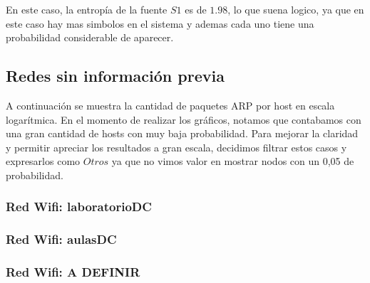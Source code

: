 En este caso, la entropía de la fuente $S1$ es de $1.98$, lo que suena logico, ya que en este caso hay mas simbolos en el sistema y ademas cada uno tiene una probabilidad considerable de aparecer.

\subsection{Redes sin información previa}
A continuación se muestra la cantidad de paquetes ARP por host en escala logarítmica. 
En el momento de realizar los gráficos, notamos que contabamos con una gran cantidad de hosts con muy baja probabilidad. 
Para mejorar la claridad y permitir apreciar los resultados a gran escala, decidimos filtrar estos casos y expresarlos como $Otros$ ya que 
no vimos valor en mostrar nodos con un 0,05 de probabilidad.\\

\subsubsection{Red Wifi: laboratorioDC}


\newpage
\subsubsection{Red Wifi: aulasDC}


\newpage
\subsubsection{Red Wifi: A DEFINIR}